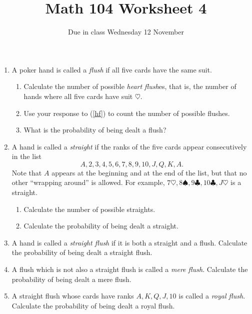 \documentclass[12pt]{article}
\author{}\date{Due in class Wednesday 12 November}
\title{Math 104 Worksheet 4}\author{}
\begin{document}
\maketitle
\pagestyle{empty}
\begin{enumerate}
\item A poker hand is called a {\em flush} if all five cards
have the same suit.
\begin{enumerate}
\item\label{hf} Calculate the number of possible {\em heart flush}es,
that is, the number of hands where all five cards have suit $\heartsuit$.
\item Use your response to (\ref{hf}) to count the number of
possible flushes.
\item What is the probability of being dealt a flush?
\end{enumerate}
\item A hand is called a {\em straight} if the ranks of the five
cards appear consecutively in the list
\[A,2,3,4,5,6,7,8,9,10,J,Q,K,A.\]
Note that $A$ appears at the beginning and at the end of the list, but
that no other ``wrapping around'' is allowed.
For example, $7\heartsuit,8\spadesuit,9\clubsuit,10\clubsuit,J\heartsuit$
is a straight.
\begin{enumerate}
\item Calculate the number of possible straights.
\item Calculate the probability of being dealt a straight.
\end{enumerate}
\item A hand is called a {\em straight flush} if it is both
a straight and a flush. Calculate the probability of being dealt
a straight flush.
\item A flush which is not also a straight flush is called a {\em mere flush}.
Calculate the probability of being dealt a mere flush.
\item A straight flush whose cards have ranks $A,K,Q,J,10$ is called
a {\em royal flush}. 
Calculate the probability of being dealt a royal flush.
\end{enumerate}
\end{document}
